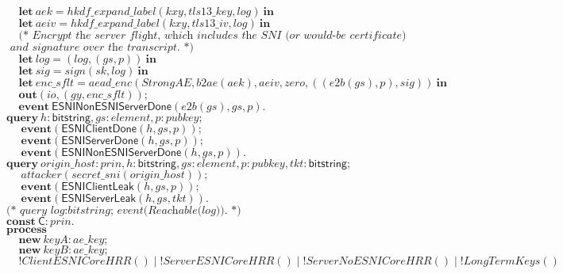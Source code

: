 \documentclass{article}
\theoremstyle{definition}
\newcommand{\kwl}[1]{\mathbf{#1}}
\newcommand{\kwc}[1]{\mathsf{#1}}
\newcommand{\kwt}[1]{\mathsf{#1}}
\newcommand{\kwe}[1]{\mathsf{#1}}
\newcommand{\var}[1]{\mathit{#1}}
\theoremstyle{definition}
\begin{document}
\begin{tabbing}
$\ \ \ \ \ \kwl{let}\ \var{aek} = \var{hkdf{\_}expand{\_}label}(\var{kxy}, \var{tls13{\_}key}, \var{log})\ \kwl{in} $\\
$\ \ \ \ \ \kwl{let}\ \var{aeiv} = \var{hkdf{\_}expand{\_}label}(\var{kxy}, \var{tls13{\_}iv}, \var{log})\ \kwl{in} $\\
$ $\\
$\ \ \ \ \ \textit{(* Encrypt the server flight, which includes the SNI (or would-be certificate) }$\\
$\textit{        and signature over the transcript. *)} $\\
$\ \ \ \ \ \kwl{let}\ \var{log} = (\var{log}, (\var{gs}, \var{p}))\ \kwl{in} $\\
$\ \ \ \ \ \kwl{let}\ \var{sig} = \var{sign}(\var{sk}, \var{log})\ \kwl{in} $\\
$\ \ \ \ \ \kwl{let}\ \var{enc{\_}sflt} = \var{aead{\_}enc}(\var{StrongAE}, \var{b2ae}(\var{aek}), \var{aeiv}, \var{zero}, ((\var{e2b}(\var{gs}), \var{p}), \var{sig}))\ \kwl{in} $\\
$\ \ \ \ \ \kwl{out}(\var{io}, (\var{gy}, \var{enc{\_}sflt})); $\\
$\ \ \ \ \ \kwl{event}\ \kwe{ESNINonESNIServerDone}(\var{e2b}(\var{gs}), \var{gs}, \var{p}). $\\
$ $\\
$\kwl{query}\ \var{h}{:}\kwt{bitstring}, \var{gs}{:}\var{element}, \var{p}{:}\var{pubkey}; $\\
$\ \ \ \ \ \ \kwl{event}(\kwe{ESNIClientDone}(\var{h}, \var{gs}, \var{p})); $\\
$\ \ \ \ \ \ \kwl{event}(\kwe{ESNIServerDone}(\var{h}, \var{gs}, \var{p})); $\\
$\ \ \ \ \ \ \kwl{event}(\kwe{ESNINonESNIServerDone}(\var{h}, \var{gs}, \var{p})). $\\
$ $\\
$\kwl{query}\ \var{origin{\_}host}{:}\var{prin}, \var{h}{:}\kwt{bitstring}, \var{gs}{:}\var{element}, \var{p}{:}\var{pubkey}, \var{tkt}{:}\kwt{bitstring}; $\\
$\ \ \ \ \ \ \var{attacker}(\var{secret{\_}sni}(\var{origin{\_}host})); $\\
$\ \ \ \ \ \ \kwl{event}(\kwe{ESNIClientLeak}(\var{h}, \var{gs}, \var{p})); $\\
$\ \ \ \ \ \ \kwl{event}(\kwe{ESNIServerLeak}(\var{h}, \var{gs}, \var{tkt})). $\\
$ $\\
$\textit{(* query log:bitstring; event(Reachable(log)). *)} $\\
$ $\\
$\kwl{const}\ \kwc{C}{:}\var{prin}. $\\
$\kwl{process} $\\
$\ \ \ \ \ \kwl{new}\ \var{keyA}{:}\var{ae{\_}key}; $\\
$\ \ \ \ \ \kwl{new}\ \var{keyB}{:}\var{ae{\_}key}; $\\
$\ \ \ \ \ !\var{ClientESNICoreHRR}()\mid!\var{ServerESNICoreHRR}()\mid!\var{ServerNoESNICoreHRR}()\mid!\var{LongTermKeys}() $\\
$$
\end{tabbing}
\end{document}
